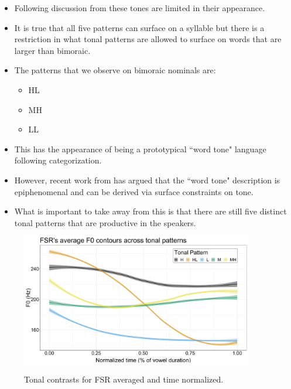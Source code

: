 \documentclass[12pt, letterpaper]{article}
\begin{document}
\begin{itemize}
	\item Following discussion from \citet{brinkerhoffTonalPatternsTheir2022} these tones are limited in their appearance.
	\item It is true that all five patterns can surface on a syllable but there is a restriction in what tonal patterns are allowed to surface on words that are larger than bimoraic.
	\item The patterns that we observe on bimoraic nominals are:
	\begin{itemize}
		\item HL 
		\item MH 
		\item LL 
	\end{itemize}
	\item This has the appearance of being a prototypical ``word tone" language following  categorization. 
	\item However, recent work from \citet{shihAutosegmentalAimsSurfaceOptimizing2019,mcphersonWordToneEpiphenomenalInpress} has argued that the ``word tone" description is epiphenomenal and can be derived via surface constraints on tone. 
	\item What is important to take away from this is that there are still five distinct tonal patterns that are productive in the speakers. 
\end{itemize}


\begin{figure}[!ht]
	\centering
	\includegraphics[width=0.9\textwidth]{../FSRTonePlot.png}
	\label{fig:FSRTonePlot}
	\caption{Tonal contrasts for FSR averaged and time normalized.}
\end{figure}
\end{document}
